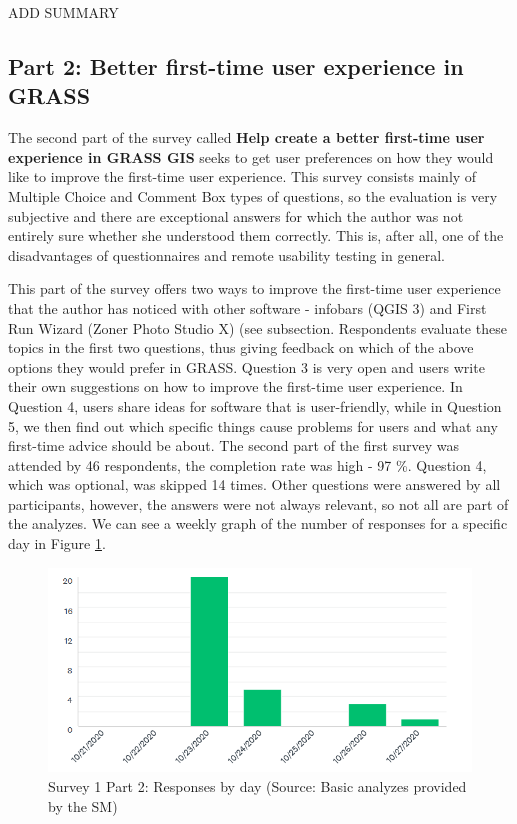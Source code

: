 \documentclass[a4paper,10pt,twoside]{article}
\begin{document}
ADD SUMMARY


\newpage
\vspace*{-1cm}
\subsection{Part 2: Better first-time user experience in GRASS}

\noindent The second part of the survey called \textbf{Help create a
  better first-time user experience in GRASS GIS} seeks to get user
preferences on how they would like to improve the first-time user
experience. This survey consists mainly of Multiple Choice and Comment
Box types of questions, so the evaluation is very subjective and there
are exceptional answers for which the author was not entirely sure
whether she understood them correctly. This is, after all, one of the
disadvantages of questionnaires and remote usability testing in
general.

This part of the survey offers two ways to improve the first-time user
experience that the author has noticed with other software - infobars
(QGIS 3) and First Run Wizard (Zoner Photo Studio X) (see subsection. Respondents
evaluate these topics in the first two questions, thus giving feedback
on which of the above options they would prefer in GRASS. Question 3
is very open and users write their own suggestions on how to improve
the first-time user experience. In Question 4, users share ideas for
software that is user-friendly, while in Question 5, we then find out
which specific things cause problems for users and what any first-time
advice should be about. The second part of the first survey was
attended by 46 respondents, the completion rate was high - 97
\%. Question 4, which was optional, was skipped 14 times. Other
questions were answered by all participants, however, the answers were
not always relevant, so not all are part of the analyzes. We can see a
weekly graph of the number of responses for a specific day in Figure
\ref{fig:survey1_part2_insight2}.

\vspace{0.3cm}
\begin{figure}[hbt!] 
\begin{center}
\includegraphics[width=15cm]{../surveys/analyzed_data/survey1_part2_insight2.png} 
\caption[Survey 1 Part 2: Responses by day]{Survey 1 Part 2: Responses by day (Source: Basic analyzes provided by the SM)}
\label{fig:survey1_part2_insight2}
\end{center}
\end{figure}
\end{document}
